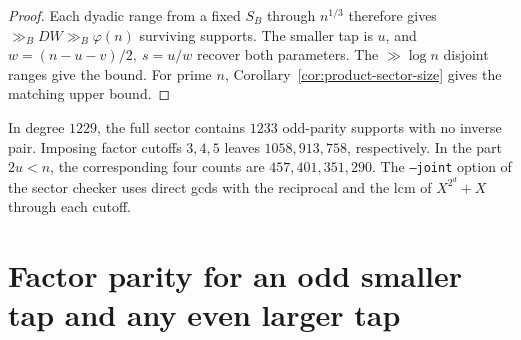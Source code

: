 \documentclass[11pt]{article}
\begin{document}
\begin{proof}
Each dyadic range from a fixed \(S_B\) through \(n^{1/3}\)
therefore gives \(\gg_B DW\gg_B\varphi(n)\) surviving supports.
The smaller tap is \(u\), and \(w=(n-u-v)/2,\ s=u/w\) recover both
parameters. The \(\gg\log n\) disjoint ranges give the bound.
For prime \(n\), Corollary~\ref{cor:product-sector-size} gives the
matching upper bound.
\end{proof}

In degree \(1229\), the full sector contains \(1233\) odd-parity
supports with no inverse pair. Imposing factor cutoffs \(3,4,5\)
leaves \(1058,913,758\), respectively. In the part \(2u<n\),
the corresponding four counts are \(457,401,351,290\).
The \texttt{--joint} option of the sector checker uses direct gcds
with the reciprocal and the lcm of \(X^{2^d}+X\) through each cutoff.

\section{Factor parity for an odd smaller tap and any even larger tap}
\label{sec:odd-smaller-tap}
\end{document}
